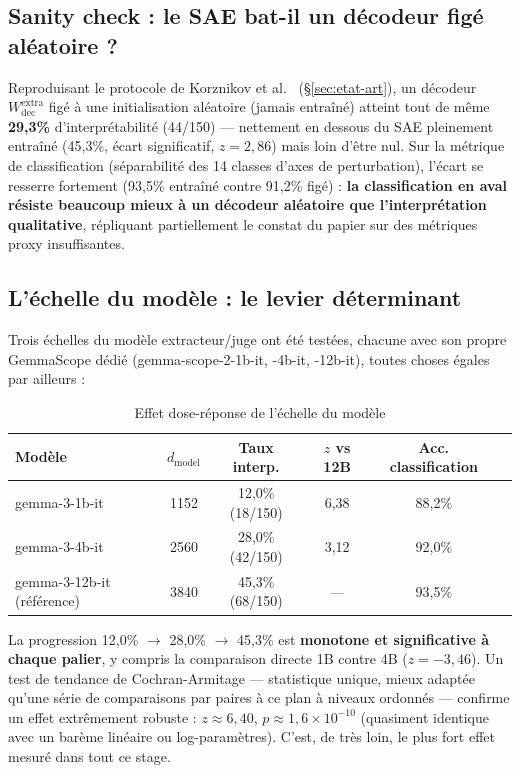 \documentclass[11pt]{article}
\begin{document}
\subsection{Sanity check : le SAE bat-il un décodeur figé aléatoire ?}
\label{subsec:sanity-check-resultats}

Reproduisant le protocole de Korznikov et al.~\cite{korznikov2025sanitychecks}
(\S\ref{sec:etat-art}), un décodeur $W_\text{dec}^\text{extra}$ figé à une
initialisation aléatoire (jamais entraîné) atteint tout de même
\textbf{29,3\%} d'interprétabilité (44/150) --- nettement en dessous du SAE
pleinement entraîné (45,3\%, écart significatif, $z=2,86$) mais loin d'être
nul. Sur la métrique de classification (séparabilité des 14 classes d'axes
de perturbation), l'écart se resserre fortement (93,5\% entraîné contre
91,2\% figé) : \textbf{la classification en aval résiste beaucoup mieux à un
décodeur aléatoire que l'interprétation qualitative}, répliquant partiellement
le constat du papier sur des métriques proxy insuffisantes.

\subsection{L'échelle du modèle : le levier déterminant}
\label{subsec:model-scale}

Trois échelles du modèle extracteur/juge ont été testées, chacune avec son
propre GemmaScope dédié (gemma-scope-2-1b-it, -4b-it, -12b-it), toutes choses
égales par ailleurs :

\begin{table}[h!]
\centering
\caption{Effet dose-réponse de l'échelle du modèle}
\label{tab:model-scale}
\vspace{0.4em}\small
\begin{tabular}{@{}lccccc@{}}
\toprule
\textbf{Modèle} & \textbf{$d_\text{model}$} & \textbf{Taux interp.} & \textbf{$z$ vs 12B} & \textbf{Acc. classification} \\ \midrule
gemma-3-1b-it & 1152 & 12,0\% (18/150) & 6,38 & 88,2\% \\
gemma-3-4b-it & 2560 & 28,0\% (42/150) & 3,12 & 92,0\% \\
gemma-3-12b-it (référence) & 3840 & 45,3\% (68/150) & --- & 93,5\% \\
\bottomrule
\end{tabular}
\end{table}

\begin{resultbox}
La progression 12,0\% $\to$ 28,0\% $\to$ 45,3\% est \textbf{monotone et
significative à chaque palier}, y compris la comparaison directe 1B contre 4B
($z=-3{,}46$). Un test de tendance de Cochran-Armitage --- statistique unique,
mieux adaptée qu'une série de comparaisons par paires à ce plan à niveaux
ordonnés --- confirme un effet extrêmement robuste :
$z \approx 6{,}40$, $p \approx 1{,}6\times10^{-10}$ (quasiment identique avec
un barème linéaire ou log-paramètres). C'est, de très loin, le plus fort
effet mesuré dans tout ce stage.
\end{resultbox}
\end{document}
